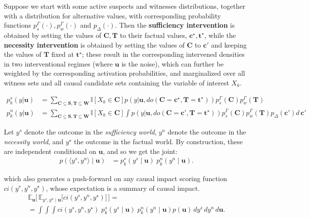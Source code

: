 \documentclass[anon,12pt]{clear2025} %
\begin{document}
\begin{definition} Suppose we start with some active suspects and witnesses distributions, together with a distribution for alternative values, with corresponding probability functions $p^\Gamma_s(\cdot), p^\Gamma_w(\cdot)$ and $p_\Delta(\cdot)$. Then the \textbf{sufficiency intervention} is obtained by setting the values of $\mathbf{C}, \mathbf{T}$ to their factual values, $\mathbf{c}^\star, \mathbf{t}^\star$, while the \textbf{necessity intervention} is obtained by setting the values of $\mathbf{C}$ to $\mathbf{c'}$ and keeping the values of $\mathbf{T}$ fixed at $\mathbf{t}^\star$; these result in the corresponding intervened densities in two interventional regimes (where $\mathbf{u}$ is the noise), which can further be weighted by the corresponding activation probabilities, and marginalized over all witness sets and all causal candidate sets containing the variable of interest $X_k$. 


\begin{align}
{p}^s_k(y \vert \mathbf{u})    &= \sum_{\mathbf{C} \subseteq \mathbf{S}, \mathbf{T}\subseteq \mathbf{W}} \mathbb{I}[X_k \in \mathbf{C}]
p (y \vert \mathbf{u}, do(\mathbf{C} = \mathbf{c^\star}, \mathbf{T} = \mathbf{t^\star})) p^\Gamma_s(\mathbf{C}) p^\Gamma_w(\mathbf{T})
\\ 
{p}^n_k(y \vert \mathbf{u})   & = \sum_{\mathbf{C} \subseteq \mathbf{S}, \mathbf{T}\subseteq \mathbf{W}} \mathbb{I}[X_k \in \mathbf{C}]
\int 
p(y \vert \mathbf{u}, do(\mathbf{C} = \mathbf{c'}, \mathbf{T} = \mathbf{t^\star}))
p^\Gamma_s(\mathbf{C}) p^\Gamma_w(\mathbf{T}) p_\Delta(\mathbf{c}') d\, \mathbf{c}'
\end{align}
\end{definition}





\begin{definition}
Let $y^s$ denote the outcome in the \emph{sufficiency world}, $y^n$ denote the outcome in the \emph{necessity world}, and $y^\star$ the outcome in the factual world. By construction, these are independent conditional on $\mathbf{u}$, and so we get the joint:
\begin{align}
 p(\langle y^s, y^n \rangle \mid \mathbf{u})  & = p^s_k(y^s \mid \mathbf{u}) \; {p}^n_k(y^n \mid \mathbf{u}).
\end{align}

\noindent which also generates a push-forward on any causal impact scoring function $ci(y^s, y^n, y^\star)$, whose expectation is a summary of causal impact.
\begin{align}\label{eq:score}
\mathbb{E}_{\mathbf{u}}\Big[\, \mathbb{E}_{y^s, y^n \mid \mathbf{u}} \big[ ci(y^s, y^n, y^\star) \big] \,\Big]
= \\  =\int 
   \int \int ci(y^s, y^n, y^\star) \; p^s_k(y^s \mid \mathbf{u}) \; p^n_k(y^n \mid \mathbf{u}) p(\mathbf{u}) 
   \, dy^s \, dy^n \, d\mathbf{u}. \nonumber
\end{align}
\end{definition}
\end{document}
